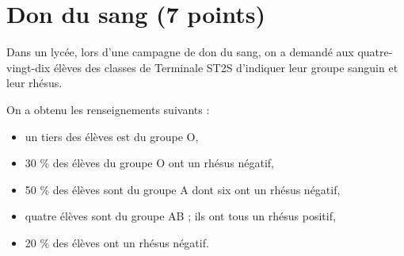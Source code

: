 \section{Don du sang (7 points)}

Dans un lycée, lors d'une campagne de don du sang, on a demandé aux quatre-vingt-dix élèves des classes de Terminale ST2S d'indiquer leur groupe sanguin et leur rhésus.

On a obtenu les renseignements suivants :
\begin{itemize}
	\item un tiers des élèves est du groupe O,
	\item 30 \% des élèves du groupe O ont un rhésus négatif,
	\item 50 \% des élèves sont du groupe A dont six ont un rhésus négatif,
	\item quatre élèves sont du groupe AB ; ils ont tous un rhésus positif,
	\item 20 \% des élèves ont un rhésus négatif.
\end{itemize}

